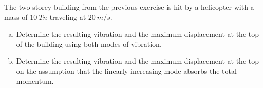 
\begin{Exercise}[label={two_storey_helicopter}]
The two storey building from the previous exercise is hit by a helicopter with a mass of $10\ Tn$ traveling at $20\ m/s$.
\begin{enumerate}[(a)]
    \item Determine the resulting vibration and the maximum displacement at the top of the building using both modes of vibration.
    \item Determine the resulting vibration and the maximum displacement at the top on the assumption that the linearly increasing mode absorbs the total momentum.
\end{enumerate}
\shortAnswer
\end{Exercise}



\begin{Answer}[ref={two_storey_helicopter}]
\end{Answer}
